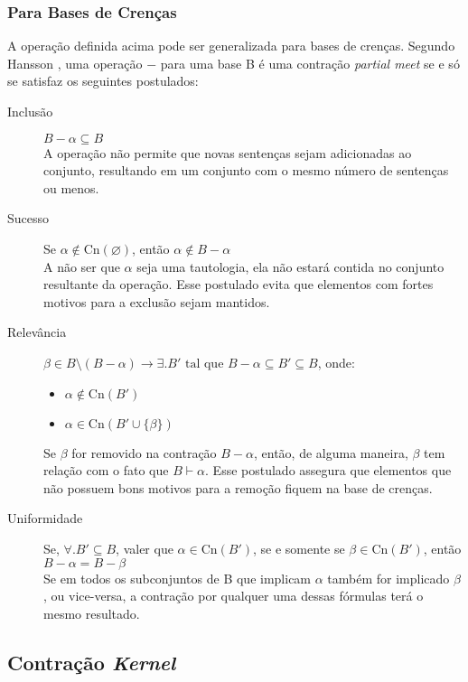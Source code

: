 \subsubsection{Para Bases de Crenças}

A operação definida acima pode ser generalizada para bases de crenças. Segundo Hansson \cite{revisaoHansson2}, uma operação $ - $ para uma base B é uma contração \textit{partial meet} se e só se satisfaz os seguintes postulados:

\begin{description}
	\item[Inclusão] $ B - \alpha \subseteq B$ \\ A operação não permite que novas sentenças sejam adicionadas ao conjunto, resultando em um conjunto com o mesmo número de sentenças ou menos.
	\item[Sucesso] Se $ \alpha \notin \text{Cn}(\varnothing) $, então $ \alpha \notin B - \alpha $ \\ A não ser que $ \alpha $ seja uma tautologia, ela não estará contida no conjunto resultante da operação. Esse postulado evita que elementos com fortes motivos para a exclusão sejam mantidos.
	\item[Relevância] $ \beta \in B \setminus (B - \alpha) \to \exists. B' \text{ tal que } B - \alpha \subseteq B' \subseteq B $, onde:
	\begin{itemize}
		\item $ \alpha \notin \text{Cn}(B') $
		\item $ \alpha \in \text{Cn}(B' \cup \{\beta\}) $ 
	\end{itemize}
	Se $ \beta $ for removido na contração $ B - \alpha $, então, de alguma maneira, $ \beta $ tem relação com o fato que $ B \vdash \alpha$. Esse postulado assegura que elementos que não possuem bons motivos para a remoção fiquem na base de crenças.
	\item[Uniformidade] Se, $ \forall.B' \subseteq B $, valer que $ \alpha \in \text{Cn}(B') $, se e somente se $ \beta \in \text{Cn}(B') $, então $ B - \alpha = B - \beta $ \\
	Se em todos os subconjuntos de B que implicam $ \alpha $ também for implicado $ \beta $, ou vice-versa, a contração por qualquer uma dessas fórmulas terá o mesmo resultado.
\end{description}

\subsection{Contração \textit{Kernel}}

